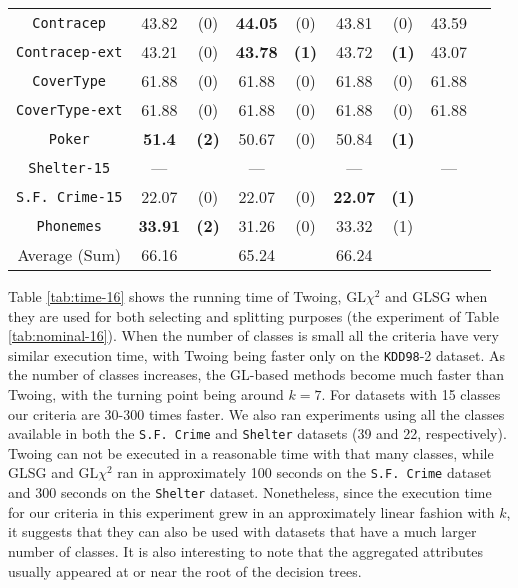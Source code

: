 \begin{table}
\begin{tabular}{c|cc|cc|cc|cc}
{\tt Contracep}     &43.82       &  (0)              &   {\bf 44.05}& (0)             &  43.81      &  (0)                 & 43.59       &                \\
{\tt Contracep-ext} &43.21       &  (0)              &   {\bf 43.78}& {\bf (1)}       &  43.72      &  {\bf (1)}           & 43.07       &                \\
{\tt CoverType}     &61.88       &  (0)              &   61.88      & (0)             &  61.88      &  (0)                 & 61.88       &                \\
{\tt CoverType-ext} &61.88       &  (0)              &   61.88      & (0)             &  61.88      &  (0)                 & 61.88       &                \\
{\tt Poker}         &{\bf 51.4}  &  {\bf (2)}        &   50.67      & (0)             &  50.84      &  {\bf (1)}           &             &                \\
{\tt Shelter-15}    &---         &                   &   ---        &                 &   ---       &                      & ---         &                \\
{\tt S.F. Crime-15} &22.07       &  (0)              &  22.07       & (0)             & {\bf 22.07} &  {\bf (1)}           &             &                \\
{\tt Phonemes}      & {\bf 33.91}&  {\bf (2)}        & 31.26        & (0)             &  33.32      &  (1)                 &             &                \\
\hline
Average (Sum)       & 66.16      &                   & 65.24        &                 &  66.24      &                      &             &
       \end{tabular}
\normalsize
\label{tab:ctree-16}
\end{table}


Table \ref{tab:time-16} shows the running time of Twoing, GL$\chi^2$ and GLSG  when
they are used for both selecting and splitting purposes (the experiment of Table \ref{tab:nominal-16}).
When the number of classes is small all the criteria have very similar execution time, with Twoing being faster only on the {\tt KDD98}-2 dataset. As the number of classes increases, the GL-based methods become much faster than Twoing, with the turning point being around $k=7$. For datasets with 15 classes our criteria are 30-300 times faster. We also ran experiments using all the classes available in both the {\tt S.F. Crime} and {\tt Shelter} datasets (39 and 22, respectively). Twoing can not be executed in a reasonable time with that many classes, while GLSG and GL$\chi^2$ ran in approximately 100 seconds on the {\tt S.F. Crime} dataset and  300 seconds on the {\tt Shelter} dataset. Nonetheless, since the execution time for our criteria in this experiment grew in an approximately linear fashion with $k$, it suggests that they can also be used with datasets that have a much larger number of classes. It is also interesting to note that the aggregated attributes usually appeared at or near the root of the decision trees.



